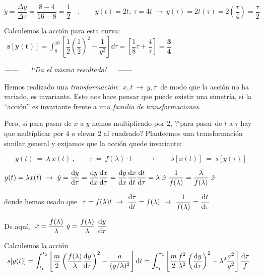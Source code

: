  $\dot y=\dfrac{\Delta y}{\Delta \tau}=\dfrac{8-4}{16-8}=\dfrac 1 2 \quad ; \qquad y(t)=2t;\ \tau=4t \ \to \ y(\tau)=2t(\tau)=2 \left( \dfrac \tau 4 \right) = \dfrac \tau 2$ 

 
Calculemos la acción para esta curva:
$\ \ \boldsymbol{ \displaystyle s[y(t)]}=\int_8^{16} \left[ \dfrac 1 2 \left( \dfrac 1 2 \right)^2 - \dfrac 1 {y^2} \right] \dd \tau=\left[ \dfrac 1 8 \tau + \dfrac 4 \tau \right]=\boldsymbol{ \dfrac 3 4}$
 
\begin{large}
 \begin{center}
 \emph{ ------ $\quad$ !`Da el mismo resultado!} $\quad$ 	------  
 \end{center}
\end{large}
 
Hemos realizado una \emph{transformación}: $\ x,t \ \to \ y,\tau \ $ de modo que la acción no ha variado, es invariante. Esto nos hace pensar que puede existir una simetría, si la ``acción'' es invariante frente a una \emph{familia de transformaciones}.

Pero, si para pasar de $x$ a $y$ hemos multiplicado por $2$, ?`para pasar de $t$ a $\tau$ hay que multiplicar por $4$ o elevar $2$ al cuadrado? Planteemos una transformación similar general y exijamos que la acción quede invariante:

\begin{equation}
\label{T14transf-inv-acc-ejemplo}
y(t) \ = \ \lambda \ x(t) \ , \qquad \tau \ = \ f(\lambda) \cdot t 	 \qquad \to \qquad s[x(t)]\ = \ s[y(\tau)]
\end{equation}

$y(t)=\lambda x(t) \ \to \ \displaystyle \dot y =\dv{y}{\tau}=\dv{y}{x}\dv{x}{\tau}=
\dv{y}{x}\dv{x}{t}\dv{t}{\tau}=\lambda \ \dot x \ \dfrac{1}{f(\lambda)}=\dfrac{\lambda}{f(\lambda)}\ \dot x$

donde hemos usado que $\ \displaystyle \tau=f(\lambda) t \ \to \ \dv{\tau}{t}=f(\lambda) \ \to \ \dfrac{1}{f(\lambda)} = \dv{t}{\tau}$

De aquí,   $\ \displaystyle \dot x= \dfrac{f(\lambda)}{\lambda} \ \dot y =
\dfrac{f(\lambda)}{\lambda} \ \displaystyle \dv{y}{\tau} $

Calculemos la acción $\ \displaystyle s[y(t)]=\int_{t_1}^{t_2} \left[ \dfrac m 2 \left( \dfrac{f(\lambda)}{\lambda} \dv{y}{\tau} \right)^2 - \dfrac {a}{(y/\lambda)^2} \right] \dd t = \int_{\tau_1}^{\tau_2} \left[ \dfrac m 2 \dfrac{f^2}{\lambda^2} \left( \dv{y}{\tau} \right)^2 - \lambda^2 \dfrac{a^2}{y^2} \right] \dfrac{\dd \tau}{f} $

